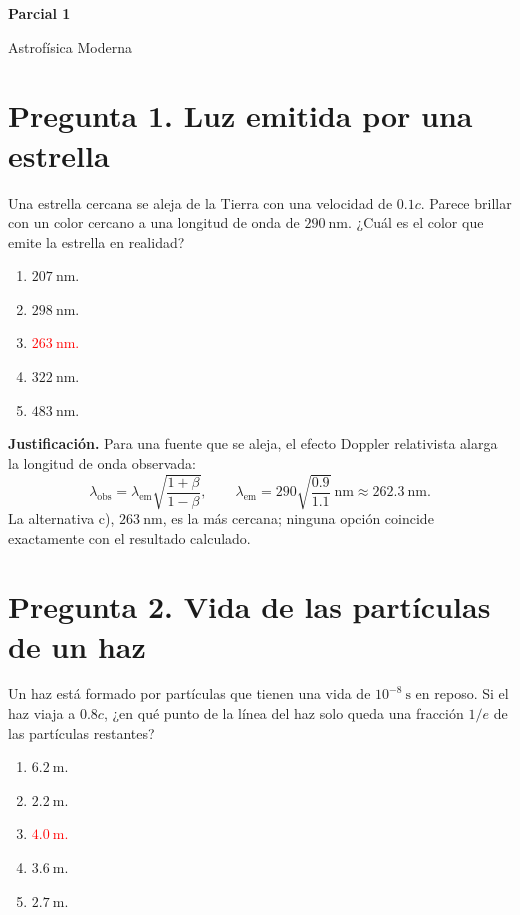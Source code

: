 \documentclass[a4paper,11pt]{article}
\newcommand{\pregunta}[2]{\section*{Pregunta #1. #2}}
\begin{document}
\begin{center}
    {\LARGE\bfseries Parcial 1\par}
    \medskip
    {\large Astrofísica Moderna\par}
\end{center}

\pregunta{1}{Luz emitida por una estrella}

Una estrella cercana se aleja de la Tierra con una velocidad de $0.1c$. Parece brillar con un color cercano a una longitud de onda de $290\ \mathrm{nm}$. ¿Cuál es el color que emite la estrella en realidad?

\begin{enumerate}
    \item $207\ \mathrm{nm}$.
    \item $298\ \mathrm{nm}$.
    \item \textcolor{red}{$263\ \mathrm{nm}$.}
    \item $322\ \mathrm{nm}$.
    \item $483\ \mathrm{nm}$.
\end{enumerate}

\textbf{Justificación.} Para una fuente que se aleja, el efecto Doppler relativista alarga la longitud de onda observada:
\[
\lambda_{\mathrm{obs}}=\lambda_{\mathrm{em}}\sqrt{\frac{1+\beta}{1-\beta}},
\qquad
\lambda_{\mathrm{em}}=290\sqrt{\frac{0.9}{1.1}}\ \mathrm{nm}
\approx262.3\ \mathrm{nm}.
\]
La alternativa c), $263\ \mathrm{nm}$, es la más cercana; ninguna opción coincide exactamente con el resultado calculado.

\pregunta{2}{Vida de las partículas de un haz}

Un haz está formado por partículas que tienen una vida de $10^{-8}\ \mathrm{s}$ en reposo. Si el haz viaja a $0.8c$, ¿en qué punto de la línea del haz solo queda una fracción $1/e$ de las partículas restantes?

\begin{enumerate}
    \item $6.2\ \mathrm{m}$.
    \item $2.2\ \mathrm{m}$.
    \item \textcolor{red}{$4.0\ \mathrm{m}$.}
    \item $3.6\ \mathrm{m}$.
    \item $2.7\ \mathrm{m}$.
\end{enumerate}
\end{document}
